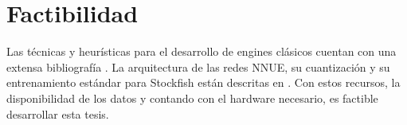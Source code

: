 \section*{Factibilidad}

Las técnicas y heurísticas para el desarrollo de engines clásicos cuentan con una extensa bibliografía \cite{cpw}. La arquitectura de las redes NNUE, su cuantización y su entrenamiento estándar para Stockfish están descritas en \cite{nnue-pytorch}. Con estos recursos, la disponibilidad de los datos \cite{lichessdb} y contando con el hardware necesario, es factible desarrollar esta tesis.
